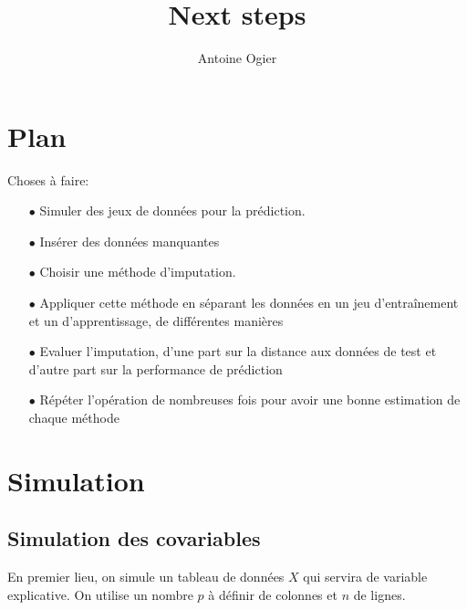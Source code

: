 \documentclass[12pt, a4paper]{article}
\title{Next steps}
\author{Antoine Ogier}
\begin{document}
\maketitle
\tableofcontents

\section*{Plan}
Choses à faire: 

\begin{itemize}
\item[$\bullet$]  Simuler des jeux de données pour la prédiction.
\item[$\bullet$]  Insérer des données manquantes
\item[$\bullet$]  Choisir une méthode d'imputation.
\item[$\bullet$]  Appliquer cette méthode en séparant les données en un jeu d'entraînement et un d'apprentissage, de différentes manières
\item[$\bullet$]  Evaluer l'imputation, d'une part sur la distance aux données de test et d'autre part sur la performance de prédiction
\item[$\bullet$]  Répéter l'opération de nombreuses fois pour avoir une bonne estimation de chaque méthode
\end{itemize}

\section{Simulation}
\label{Simulation}
\subsection{Simulation des covariables}
En premier lieu, on simule un tableau de données $X$ qui servira de variable explicative. On utilise un nombre $p$ à définir de colonnes et $n$ de lignes.
\end{document}
